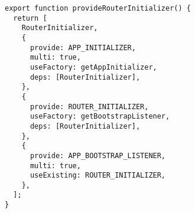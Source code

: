 \begin{verbatim}
export function provideRouterInitializer() {
  return [
    RouterInitializer,
    {
      provide: APP_INITIALIZER,
      multi: true,
      useFactory: getAppInitializer,
      deps: [RouterInitializer],
    },
    {
      provide: ROUTER_INITIALIZER,
      useFactory: getBootstrapListener,
      deps: [RouterInitializer],
    },
    {
      provide: APP_BOOTSTRAP_LISTENER,
      multi: true,
      useExisting: ROUTER_INITIALIZER,
    },
  ];
}
\end{verbatim}
